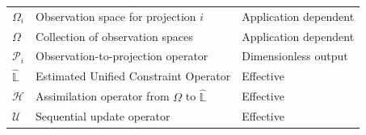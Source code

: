 \begin{table}
\begin{tabular}{p{}p{}p{}}
\(\Omega_i\) & Observation space for projection \(i\) & Application dependent \\
\(\Omega\) & Collection of observation spaces & Application dependent \\
\(\mathcal{P}_i\) & Observation-to-projection operator & Dimensionless output \\
\(\hat{\mathbb{L}}\) & Estimated Unified Constraint Operator & Effective \\
\(\mathcal{H}\) & Assimilation operator from \(\Omega\) to \(\hat{\mathbb{L}}\) & Effective \\
\(\mathcal{U}\) & Sequential update operator & Effective \\
\hline
\end{tabular}
\end{table}
